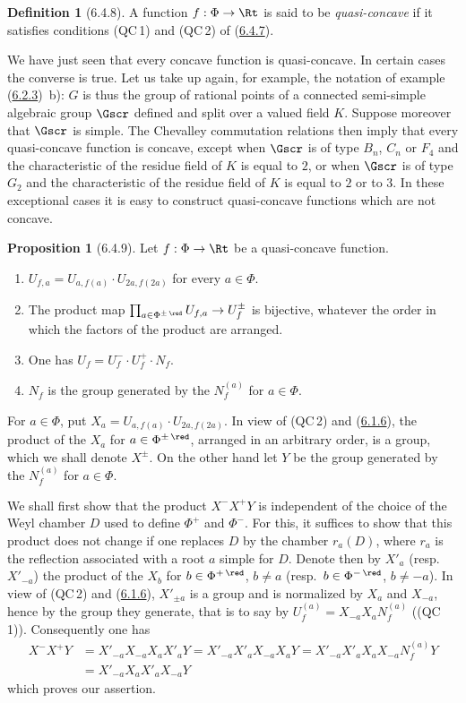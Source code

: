 \documentclass[12pt,a4paper,oneside,english]{smfart}
\makeatletter
\newcommand{\btanchor}[1]{\leavevmode\Hy@raisedlink{\hypertarget{bt:#1}{}}}
\newcommand{\btref}[1]{\hyperlink{bt:#1}{#1}}
\theoremstyle{definition}
\theoremstyle{bt}
\newtheorem{prop}{Proposition}
\newtheorem{defn}{Definition}
\makeatother
\begin{document}
\begin{defn}[6.4.8]\btanchor{6.4.8}
A function $f:\Phi\to\Rt$ is said to be \emph{quasi-concave} if it satisfies
conditions (QC\,1) and (QC\,2) of (\btref{6.4.7}).
\end{defn}

We have just seen that every concave function is quasi-concave. In certain
cases the converse is true. Let us take up again, for example, the notation
of example (\btref{6.2.3})~b): $G$ is thus the group of rational points of a
connected semi-simple algebraic group $\Gscr$ defined and split over a
valued field $K$. Suppose moreover that $\Gscr$ is simple. The Chevalley
commutation relations then imply that every quasi-concave function is
concave, except when $\Gscr$ is of type $B_n$, $C_n$ or $F_4$ and the
characteristic of the residue field of $K$ is equal to $2$, or when
$\Gscr$ is of type $G_2$ and the characteristic of the residue field of $K$
is equal to $2$ or to $3$. In these exceptional cases it is easy to
construct quasi-concave functions which are not concave.

\begin{prop}[6.4.9]\btanchor{6.4.9}
Let $f:\Phi\to\Rt$ be a quasi-concave function.
\begin{enumerate}[label=(\roman*),leftmargin=2.2em]
\item $U_{f,a}=U_{a,f(a)}\cdot U_{2a,f(2a)}$ for every $a\in\Phi$.
\item The product map
      $\prod_{a\in\Phi^{\pm\,\red}}U_{f,a}\to U_f^{\pm}$
      is bijective, whatever the order in which the factors of the product
      are arranged.
\item One has $U_f=U_f^{-}\cdot U_f^{+}\cdot N_f$.
\item $N_f$ is the group generated by the $N_f^{(a)}$ for $a\in\Phi$.
\end{enumerate}
\end{prop}

For $a\in\Phi$, put $X_a=U_{a,f(a)}\cdot U_{2a,f(2a)}$. In view of (QC\,2)
and (\btref{6.1.6}), the product of the $X_a$ for $a\in\Phi^{\pm\,\red}$, arranged
in an arbitrary order, is a group, which we shall denote $X^{\pm}$. On the
other hand let $Y$ be the group generated by the $N_f^{(a)}$ for $a\in\Phi$.

We shall first show that the product $X^{-}X^{+}Y$ is independent of the
choice of the Weyl chamber $D$ used to define $\Phi^{+}$ and $\Phi^{-}$.
For this, it suffices to show that this product does not change if one
replaces $D$ by the chamber $r_a(D)$, where $r_a$ is the reflection
associated with a root $a$ simple for $D$. Denote then by $X'_a$ (resp.\
$X'_{-a}$) the product of the $X_b$ for $b\in\Phi^{+\,\red}$, $b\neq a$
(resp.\ $b\in\Phi^{-\,\red}$, $b\neq-a$). In view of (QC\,2) and (\btref{6.1.6}),
$X'_{\pm a}$ is a group and is normalized by $X_a$ and $X_{-a}$, hence by
the group they generate, that is to say by
$U_f^{(a)}=X_{-a}X_aN_f^{(a)}$ ((QC\,1)). Consequently one has
\begin{align*}
  X^{-}X^{+}Y&=X'_{-a}X_{-a}X_aX'_aY=X'_{-a}X'_aX_{-a}X_aY
   =X'_{-a}X'_aX_aX_{-a}N_f^{(a)}Y\\
  &=X'_{-a}X_aX'_aX_{-a}Y
\end{align*}
which proves our assertion.
\end{document}
